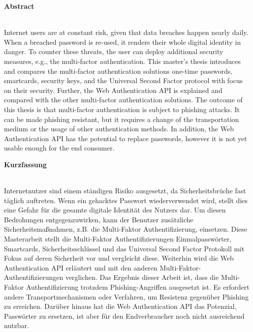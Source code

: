 \thispagestyle{noheader}
\setlength{\columnsep}{1cm}

{}

\begin{large}
	\textbf{Abstract} \\ \\
\end{large}
Internet users are at constant risk, given that data breaches happen nearly daily. When a breached password is re-used, it renders their whole digital identity in danger. To counter these threats, the user can deploy additional security measures, e.g., the multi-factor authentication. This master's thesis introduces and compares the multi-factor authentication solutions one-time passwords, smartcards, security keys, and the Universal Second Factor protocol with focus on their security. Further, the Web Authentication API is explained and compared with the other multi-factor authentication solutions. The outcome of this thesis is that multi-factor authentication is subject to phishing attacks. It can be made phishing resistant, but it requires a change of the transportation medium or the usage of other authentication methods. In addition, the Web Authentication API has the potential to replace passwords, however it is not yet usable enough for the end consumer.


\addvspace{0.7cm}

\begin{large}
	\textbf{Kurzfassung} \\ \\
\end{large}
Internetnutzer sind einem ständigen Risiko ausgesetzt, da Sicherheitsbrüche fast täglich auftreten. Wenn ein gehacktes Passwort wiederverwendet wird, stellt dies eine Gefahr für die gesamte digitale Identität des Nutzers dar. Um diesen Bedrohungen entgegenzuwirken, kann der Benutzer zusätzliche Sicherheitsmaßnahmen, z.B. die Multi-Faktor Authentifizierung, einsetzen. Diese Masterarbeit stellt die Multi-Faktor Authentifizierungen Einmalpasswörter, Smartcards, Sicherheitsschlüssel und das Universal Second Factor Protokoll mit Fokus auf deren Sicherheit vor und vergleicht diese. Weiterhin wird die Web Authentication API erläutert und mit den anderen Multi-Faktor-Authentifizierungen verglichen. Das Ergebnis dieser Arbeit ist, dass die Multi-Faktor Authentifizierung trotzdem Phishing-Angriffen ausgesetzt ist. Es erfordert andere Transportmechanismen oder Verfahren, um Resistenz gegenüber Phishing zu erreichen. Darüber hinaus hat die Web Authentication API das Potenzial, Passwörter zu ersetzen, ist aber für den Endverbraucher noch nicht ausreichend nutzbar.


\newpage